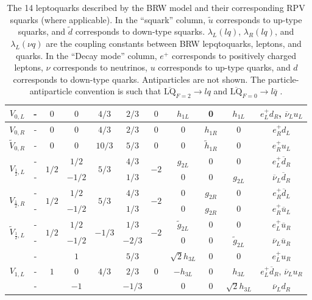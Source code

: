 \begin{table}
\begin{tabular}{cc|cc|c|c|c|ccc|c}
    \hline\hline    
    $V_{0,L}$  & - & $0$ & $0$  & $4/3$ & $2/3$ & $0$ & $h_{1L}$ &0  & $h_{1L}$ &  $e_{L}^{+}d_{R}$, $\overline{\nu}_{L}u_{L}$ \\
    \hline
    $V_{0,R}$  & -  & $0$ & $0$  & $4/3$ & $2/3$ & $0$ & 0 & $h_{1R}$ & 0 & $e_{R}^{+}d_{L}$ \\
    \hline
    $\tilde{V}_{0,R}$  & -  & $0$ & $0$  & $10/3$ & $5/3$ & $0$ & 0 & ${\tilde h}_{1R}$ & 0 & $e_{R}^{+}u_{L}$ \\
    \hline
    \multirow{2}{*}{$V_{\frac{1}{2},L}$} & - & \multirow{2}{*}{$1/2$}
    &   $1/2$ & \multirow{2}{*}{$5/3$} & $4/3$ & \multirow{2}{*}{$-2$} & $g_{2L} $ & 0 & 0 & $e_{L}^{+}\overline{d}_{R}$ \\
    & - & & $-1/2$  & & $1/3$ & & 0 & 0 & $g_{2L}$ & $\overline{\nu}_{L}\overline{d}_{R}$ \\
    \hline
    \multirow{2}{*}{$V_{\frac{1}{2},R}$} & - & \multirow{2}{*}{$1/2$} 
    &  $1/2$ &\multirow{2}{*}{$5/3$} & $4/3$ & \multirow{2}{*}{$-2$} & 0 & $g_{2R}$ & 0 & $e_{R}^{+}\overline{d}_{L}$ \\
    & - & & $-1/2$ & & $1/3$ & &0  & $g_{2R}$& 0 &  $e_{R}^{+}\overline{u}_{L}$ \\
    \hline
    \multirow{2}{*}{$\tilde{V}_{\frac{1}{2},L}$} & - & \multirow{2}{*}{$1/2$}
    & $1/2$ & \multirow{2}{*}{$-1/3$} & $1/3$ & \multirow{2}{*}{$-2$} & ${\tilde g}_{2L}$  & 0 & 0 & $e_{L}^{+}\overline{u}_{R}$ \\
    & - & & $-1/2$ & & $-2/3$ & & 0 & 0 & ${\tilde g}_{2L}$ &  $\overline{\nu}_{L}\overline{u}_{R}$ \\
    \hline
    \multirow{3}{*}{$V_{1,L}$} & - & \multirow{3}{*}{$1$} 
    &  $1$   & \multirow{3}{*}{$4/3$} & $5/3$ & \multirow{3}{*}{$0$} & $\sqrt{2}h_{3L}$ & 0 & 0 & $e_{L}^{+}u_{R}$ \\
    & - & & $0$   & & $2/3$ & & $-h_{3L}$ & 0 & $h_{3L}$ & $e_{L}^{+}\overline{d}_{R}$, $\overline{\nu}_{L}u_{R}$ \\
    & - & & $-1$   & & $-1/3$  & & 0 & 0 & $\sqrt{2}h_{3L}$ & $\overline{\nu}_{L}d_{R}$   \\
  \end{tabular}
  \caption{
    The 14 leptoquarks described by the BRW model and their corresponding RPV squarks (where applicable).
    In the ``squark'' column, ${\tilde u}$ corresponds to up-type squarks, and ${\tilde d}$ corresponds to down-type squarks.  
    $\lambda_{L}(lq)$, $\lambda_{R}(lq)$, and $\lambda_{L}(\nu q)$
    are the coupling constants between BRW lepqtoquarks, leptons, and quarks.
    In the ``Decay mode'' column, $e^{+}$ corresponds to positively charged leptons, $\nu$ corresponds to neutrinos,
    $u$ corresponds to up-type quarks, and $d$ corresponds to down-type quarks.  
    Antiparticles are not shown.
    The particle-antiparticle 
    convention is such that $\overline{\text{LQ}}_{F=2}\rightarrow lq$ and $\overline{\text{LQ}}_{F=0}\rightarrow l\overline{q}$ 
    \cite{lq-classification}.
  }
  \label{tab:lq-classification}
  \renewcommand{\arraystretch}{1.0}
\end{table}

